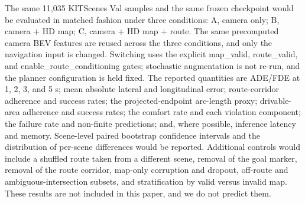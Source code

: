 \documentclass[
  english,
  10pt,
]{article}
\begin{document}
The same 11,035 KITScenes Val samples and the same frozen checkpoint
would be evaluated in matched fashion under three conditions: A, camera
only; B, camera + HD map; C, camera + HD map + route. The same
precomputed camera BEV features are reused across the three conditions,
and only the navigation input is changed. Switching uses the explicit
map\_valid, route\_valid, and enable\_route\_conditioning gates;
stochastic augmentation is not re-run, and the planner configuration is
held fixed. The reported quantities are ADE/FDE at 1, 2, 3, and 5 s;
mean absolute lateral and longitudinal error; route-corridor adherence
and success rates; the projected-endpoint arc-length proxy;
drivable-area adherence and success rates; the comfort rate and each
violation component; the failure rate and non-finite predictions; and,
where possible, inference latency and memory. Scene-level paired
bootstrap confidence intervals and the distribution of per-scene
differences would be reported. Additional controls would include a
shuffled route taken from a different scene, removal of the goal marker,
removal of the route corridor, map-only corruption and dropout,
off-route and ambiguous-intersection subsets, and stratification by
valid versus invalid map. These results are not included in this paper,
and we do not predict them.
\end{document}
